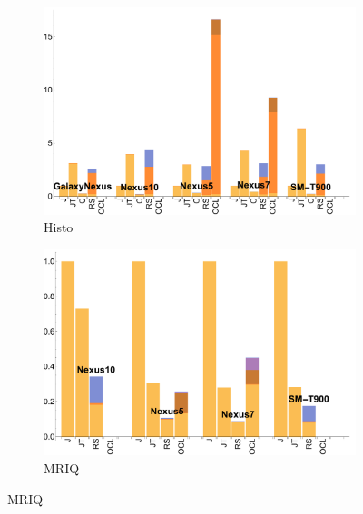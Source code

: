\begin{figure}[ht]
  \begin{subfigure}[b]{0.5\textwidth}
      \centering
      \includegraphics[width=\textwidth]{data/Histogram_onecompute_time.pdf}
      \caption{Histo}\label{fig:histo}
  \end{subfigure}
  \begin{subfigure}[b]{0.5\textwidth}
      \centering
      \includegraphics[width=\textwidth]{data/Mriq_onecompute_time.pdf}
      \caption{MRIQ}
      \label{fig:MRIQ}
  \end{subfigure}


\end{figure}
